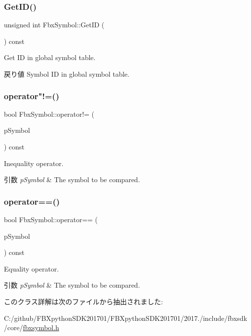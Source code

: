 \subsubsection{\texorpdfstring{Get\+I\+D()}{GetID()}}
{\footnotesize\ttfamily unsigned int Fbx\+Symbol\+::\+Get\+ID (\begin{DoxyParamCaption}{ }\end{DoxyParamCaption}) const}

Get ID in global symbol table. \begin{DoxyReturn}{戻り値}
Symbol ID in global symbol table. 
\end{DoxyReturn}
\mbox{\label{class_fbx_symbol_a8ff86aa00a433b63b02d4a5f1cd502b8}} 
\subsubsection{\texorpdfstring{operator"!=()}{operator!=()}}
{\footnotesize\ttfamily bool Fbx\+Symbol\+::operator!= (\begin{DoxyParamCaption}\item[{\hyperlink{class_fbx_symbol}{Fbx\+Symbol} const \&}]{p\+Symbol }\end{DoxyParamCaption}) const}

Inequality operator. 
\begin{DoxyParams}{引数}
{\em p\+Symbol} & The symbol to be compared. \\
\hline
\end{DoxyParams}
\mbox{\label{class_fbx_symbol_a12639dda60610e915b51c4c71e572380}} 
\subsubsection{\texorpdfstring{operator==()}{operator==()}}
{\footnotesize\ttfamily bool Fbx\+Symbol\+::operator== (\begin{DoxyParamCaption}\item[{\hyperlink{class_fbx_symbol}{Fbx\+Symbol} const \&}]{p\+Symbol }\end{DoxyParamCaption}) const}

Equality operator. 
\begin{DoxyParams}{引数}
{\em p\+Symbol} & The symbol to be compared. \\
\hline
\end{DoxyParams}


このクラス詳解は次のファイルから抽出されました\+:\begin{DoxyCompactItemize}
\item 
C\+:/github/\+F\+B\+Xpython\+S\+D\+K201701/\+F\+B\+Xpython\+S\+D\+K201701/2017./include/fbxsdk/core/\hyperlink{fbxsymbol_8h}{fbxsymbol.\+h}\end{DoxyCompactItemize}

